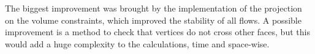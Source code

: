 \documentclass{article}
\begin{document}
The biggest improvement was brought by the implementation of the projection
on the volume constraints, which improved the stability of all flows.
A possible improvement is a method to check that vertices do not cross other
faces, but this would add a huge complexity to the calculations, time and space-wise.
\end{document}
